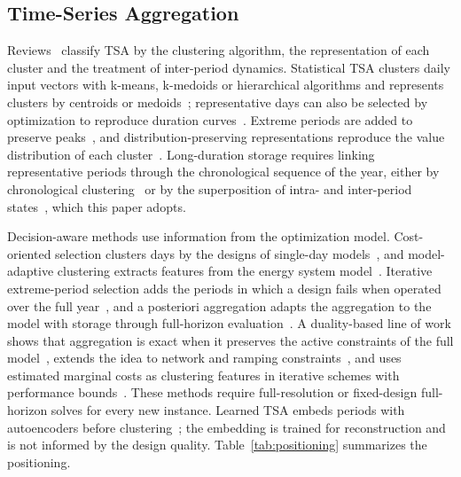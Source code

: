 \documentclass[journal]{IEEEtran}
\begin{document}
\subsection{Time-Series Aggregation}
Reviews~\cite{hoffmann2020review,teichgraeber2022review} classify TSA by the clustering algorithm, the representation of each cluster and the treatment of inter-period dynamics. Statistical TSA clusters daily input vectors with k-means, k-medoids or hierarchical algorithms and represents clusters by centroids or medoids~\cite{kotzur2018impact,teichgraeber2019clustering}; representative days can also be selected by optimization to reproduce duration curves~\cite{poncelet2017selecting}. Extreme periods are added to preserve peaks~\cite{kotzur2018impact}, and distribution-preserving representations reproduce the value distribution of each cluster~\cite{hoffmann2022pareto}. Long-duration storage requires linking representative periods through the chronological sequence of the year, either by chronological clustering~\cite{pineda2018chronological} or by the superposition of intra- and inter-period states~\cite{kotzur2018seasonal}, which this paper adopts.

Decision-aware methods use information from the optimization model. Cost-oriented selection clusters days by the designs of single-day models~\cite{sun2019costoriented}, and model-adaptive clustering extracts features from the energy system model~\cite{zhang2023modeladaptive}. Iterative extreme-period selection adds the periods in which a design fails when operated over the full year~\cite{teichgraeber2021iterative}, and a posteriori aggregation adapts the aggregation to the model with storage through full-horizon evaluation~\cite{hilbers2023aposteriori}. A duality-based line of work shows that aggregation is exact when it preserves the active constraints of the full model~\cite{wogrin2023onesize}, extends the idea to network and ramping constraints~\cite{cardonavasquez2024enhancing}, and uses estimated marginal costs as clustering features in iterative schemes with performance bounds~\cite{santosuosso2026marginal,rybka2026mlexact}. These methods require full-resolution or fixed-design full-horizon solves for every new instance. Learned TSA embeds periods with autoencoders before clustering~\cite{barbar2022autoencoder}; the embedding is trained for reconstruction and is not informed by the design quality. Table~\ref{tab:positioning} summarizes the positioning.
\end{document}
